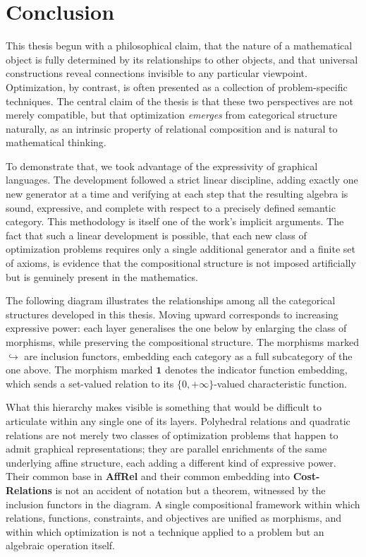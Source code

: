 \section{Conclusion}

This thesis begun with a philosophical claim, that the nature
of a mathematical object is fully determined by its relationships to other objects,
and that universal constructions reveal connections invisible to any particular
viewpoint. Optimization, by contrast, is often presented as a
collection of problem-specific techniques. The central claim of the thesis is
that these two perspectives are not merely compatible, but that optimization
\emph{emerges} from categorical structure naturally, as an intrinsic property of
relational composition and is natural to mathematical thinking.

To demonstrate that, we took advantage of the expressivity of graphical languages.
The development followed a strict linear discipline, adding exactly one new
generator at a time and verifying at each step that the resulting algebra is
sound, expressive, and complete with respect to a precisely defined semantic
category. This methodology is itself one
of the work's implicit arguments. The fact that such a linear development is
possible, that each new class of optimization problems requires only a single
additional generator and a finite set of axioms, is evidence that the
compositional structure is not imposed artificially but is genuinely present in
the mathematics.

The following diagram illustrates the relationships among all the categorical
structures developed in this thesis. Moving upward corresponds to increasing
expressive power: each layer generalises the one below by enlarging the class
of morphisms, while preserving the compositional structure. The morphisms
marked $\hookrightarrow$ are inclusion functors, embedding each category as a
full subcategory of the one above. The morphism marked $\mathbf{1}$ denotes the
indicator function embedding, which sends a set-valued relation to its
$\{0,+\infty\}$-valued characteristic function.

What this hierarchy makes visible is something that would be difficult to
articulate within any single one of its layers. Polyhedral relations and
quadratic relations are not merely two classes of optimization problems that
happen to admit graphical representations; they are parallel enrichments of the
same underlying affine structure, each adding a different kind of expressive
power. Their common base in \textbf{AffRel} and their common embedding into
\textbf{Cost-Relations} is not an accident of notation but a theorem, witnessed
by the inclusion functors in the diagram. A single compositional
framework within which relations, functions, constraints, and objectives are
unified as morphisms, and within which optimization is not a technique applied
to a problem but an algebraic operation itself.


